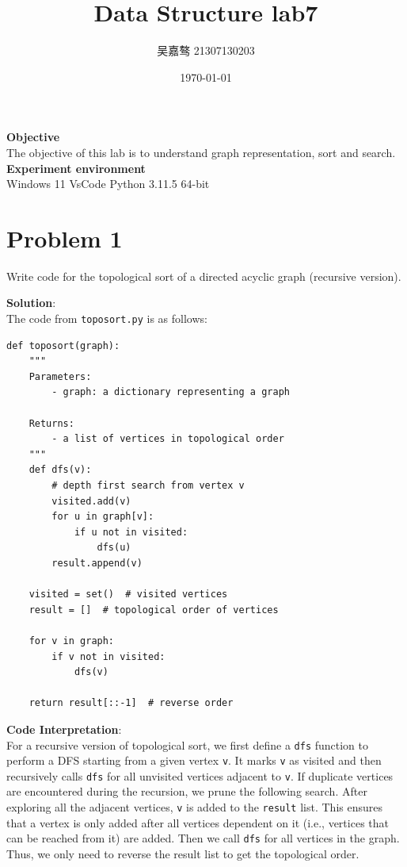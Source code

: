 \documentclass[UTF8]{ctexart}
\title{\textbf{Data Structure lab7}}
\author{吴嘉骜 21307130203}
\date{\today}
\begin{document}
\maketitle

\noindent
\textbf {\large Objective}\\  The objective of this lab is to understand graph representation, sort and search.\\
\noindent
\textbf {\large Experiment environment} \\
   Windows 11 VsCode Python 3.11.5 64-bit\\

\setlength{\parindent}{0pt}
\section*{Problem 1}
Write code for the topological sort of a directed acyclic graph (recursive version).

\textbf{\large Solution}:\\
The code from \texttt{toposort.py} is as follows:

\begin{lstlisting}
def toposort(graph):
    """
    Parameters:
        - graph: a dictionary representing a graph
        
    Returns:
        - a list of vertices in topological order
    """
    def dfs(v):
        # depth first search from vertex v
        visited.add(v)
        for u in graph[v]:
            if u not in visited:
                dfs(u)
        result.append(v)
    
    visited = set()  # visited vertices
    result = []  # topological order of vertices
    
    for v in graph:
        if v not in visited:
            dfs(v)
            
    return result[::-1]  # reverse order
\end{lstlisting}
\textbf{\large Code Interpretation}:\\
For a recursive version of topological sort, we first define a \texttt{dfs} function to perform a DFS starting from a given vertex \texttt{v}. 
It marks \texttt{v} as visited and then recursively calls \texttt{dfs} for all unvisited vertices adjacent to \texttt{v}.
If duplicate vertices are encountered during the recursion, we prune the following search.
After exploring all the adjacent vertices, \texttt{v} is added to the \texttt{result} list. 
This ensures that a vertex is only added after all vertices dependent on it (i.e., vertices that can be reached from it) are added.
Then we call \texttt{dfs} for all vertices in the graph.
Thus, we only need to reverse the result list to get the topological order.
\end{document}
